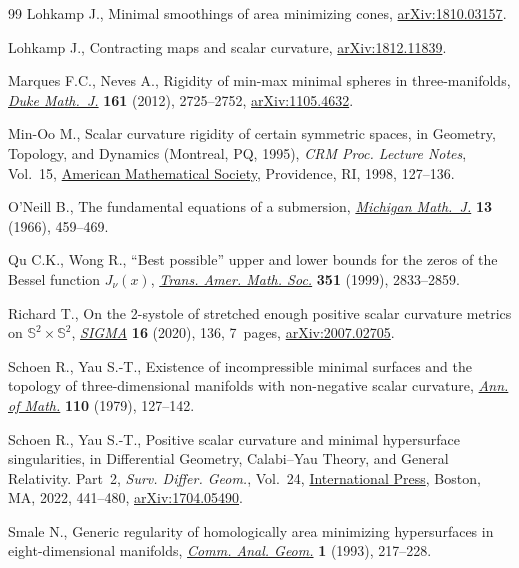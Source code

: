\documentclass[pdftex]{sigma}
\numberwithin{equation}{section}
\begin{document}
\begin{thebibliography}{99}
Lohkamp J., Minimal smoothings of area minimizing cones, \href{https://arxiv.org/abs/1810.03157}{arXiv:1810.03157}.

Lohkamp J., Contracting maps and scalar curvature, \href{https://arxiv.org/abs/1812.11839}{arXiv:1812.11839}.

Marques F.C., Neves A., Rigidity of min-max minimal spheres in three-manifolds,
  \href{https://doi.org/10.1215/00127094-1813410}{\textit{Duke Math.~J.}} \textbf{161} (2012), 2725--2752, \href{https://arxiv.org/abs/1105.4632}{arXiv:1105.4632}.

Min-Oo M., Scalar curvature rigidity of certain symmetric spaces, in Geometry,
  {T}opology, and {D}ynamics ({M}ontreal, {PQ}, 1995), \textit{CRM Proc.
  Lecture Notes}, Vol.~15, \href{https://doi.org/10.1090/crmp/015/08}{American Mathematical Society}, Providence, RI, 1998,
  127--136.

O'Neill B., The fundamental equations of a submersion, \href{https://doi.org/10.1307/mmj/1028999604}{\textit{Michigan
  Math.~J.}} \textbf{13} (1966), 459--469.

Qu C.K., Wong R., ``{B}est possible'' upper and lower bounds for the zeros of
  the {B}essel function {$J_\nu(x)$}, \href{https://doi.org/10.1090/S0002-9947-99-02165-0}{\textit{Trans. Amer. Math. Soc.}}
  \textbf{351} (1999), 2833--2859.

Richard T., On the 2-systole of stretched enough positive scalar curvature
  metrics on {$\mathbb S^2\times\mathbb S^2$}, \href{https://doi.org/10.3842/SIGMA.2020.136}{\textit{SIGMA}} \textbf{16}
  (2020), 136, 7~pages, \href{https://arxiv.org/abs/2007.02705}{arXiv:2007.02705}.

Schoen R., Yau S.-T., Existence of incompressible minimal surfaces and the
  topology of three-dimensional manifolds with non-negative scalar curvature,
  \href{https://doi.org/10.2307/1971247}{\textit{Ann. of Math.}} \textbf{110} (1979), 127--142.

Schoen R., Yau S.-T., Positive scalar curvature and minimal hypersurface
  singularities, in {D}ifferential {G}eometry, {C}alabi--{Y}au {T}heory, and
  {G}eneral {R}elativity. {P}art~2, \textit{Surv. Differ. Geom.}, Vol.~24,
  \href{https://doi.org/10.4310/SDG.2019.v24.n1.a10}{International Press}, Boston, MA, 2022, 441--480, \href{https://arxiv.org/abs/1704.05490}{arXiv:1704.05490}.

Smale N., Generic regularity of homologically area minimizing hypersurfaces in
  eight-dimensional manifolds, \href{https://doi.org/10.4310/CAG.1993.v1.n2.a2}{\textit{Comm. Anal. Geom.}} \textbf{1} (1993),
  217--228.


\end{thebibliography}
\end{document}

